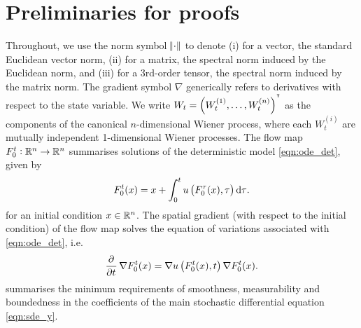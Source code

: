 
\section{Preliminaries for proofs}\label{app:gauss}

Throughout, we use the norm symbol \(\norm{\cdot}\) to denote (i) for a vector, the standard Euclidean vector norm, (ii) for a matrix, the spectral norm induced by the Euclidean norm, and (iii) for a 3rd-order tensor, the spectral norm induced by the matrix norm.
The gradient symbol \(\nabla\) generically refers to derivatives with respect to the state variable.
We write \(W_t = \left(W_t^{(1)}, \hdots, W_t^{(n)}\right)^{^{\intercal}}\) as the components of the canonical \(n\)-dimensional Wiener process, where each \(W_t^{(i)}\) are mutually independent 1-dimensional Wiener processes.
The flow map \(F_0^t: \mathbb{R}^n \to \mathbb{R}^n\) summarises solutions of the deterministic model \eqref{eqn:ode_det}, given by
\begin{equation}
	F_{0}^{t}(x) = x + \int_{0}^{t}{u\left(F_{0}^{\tau}(x), \tau\right)\dif \tau}.
	\label{eqn:flow_map_int}
\end{equation}
for an initial condition \(x \in \mathbb{R}^n\).
The spatial gradient (with respect to the initial condition) of the flow map solves the equation of variations associated with \eqref{eqn:ode_det}, i.e.
\begin{equation}
	\dpd{}{t}\nabla F_0^t(x) = \nabla u\left(F_0^t(x), t\right)\nabla F_0^t(x).
	\label{eqn:eqn_of_vars}
\end{equation}
 summarises the minimum requirements of smoothness, measurability and boundedness in the coefficients of the main stochastic differential equation \eqref{eqn:sde_y}.

